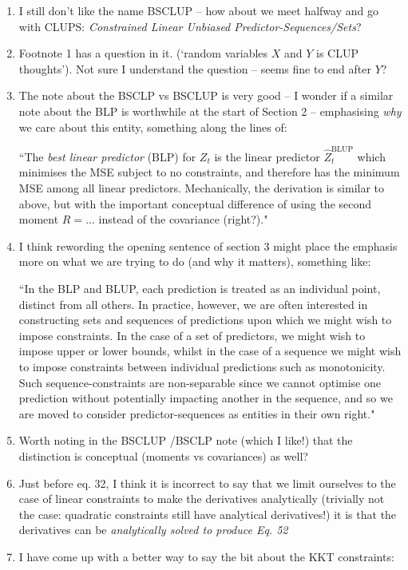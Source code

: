 \documentclass[]{article}
\begin{document}
	
		\begin{enumerate}
			\item I still don't like the name BSCLUP -- how about we meet halfway and go with CLUPS: \textit{Constrained Linear Unbiased Predictor-Sequences/Sets}? 
			\item Footnote 1 has a question in it. (`random variables $X$ and $Y$ is CLUP thoughts'). Not sure I understand the question -- seems fine to end after $Y$?
			\item The note about the BSCLP vs BSCLUP is very good -- I wonder if a similar note about the BLP is worthwhile at the start of Section 2 -- emphasising \textit{why} we care about this entity, something along the lines of:
			
			``The \textit{best linear predictor} (BLP) for $Z_t$ is the linear predictor $\hat{Z}_t^\text{BLUP}$ which minimises the MSE subject to no constraints, and therefore has the minimum MSE among all linear predictors. Mechanically, the derivation is similar to above, but with the important conceptual difference of using the second moment $R = ...$ instead of the covariance (right?)."
			\item I think rewording the opening sentence of section 3 might place the emphasis more on what we are trying to do (and why it matters), something like:
			
			``In the BLP and BLUP, each prediction is treated as an individual point, distinct from all others. In practice, however, we are often interested in constructing sets and sequences of predictions upon which we might wish to impose constraints. In the case of a set of predictors, we might wish to impose upper or lower bounds, whilst in the case of a sequence we might wish to impose constraints between individual predictions such as monotonicity. Such sequence-constraints are non-separable since we cannot optimise one prediction without potentially impacting another in the sequence, and so we are moved to consider predictor-sequences as entities in their own right."
			\item Worth noting in the BSCLUP /BSCLP note (which I like!) that the distinction is conceptual (moments vs covariances) as well?
			\item Just before eq. 32, I think it is incorrect to say that we limit ourselves to the case of linear constraints to make the derivatives analytically (trivially not the case: quadratic constraints still have analytical derivatives!) it is that the derivatives can be \textit{analytically solved to produce Eq. 52} 
			\item I have come up with a better way to say the bit about the KKT constraints:
			

\end{enumerate}
\end{document}

